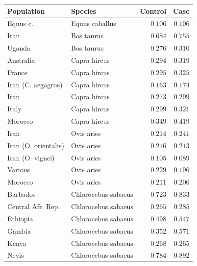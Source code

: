 \documentclass{article}
\begin{document}
    \begin{center}
        \begin{tabular}{|l|l|r|r|}
            \toprule
            Population & Species & Control & Case \\
            \midrule
            \rowcolor{LIGHTGREY} Equus c. & Equus caballus & $ 0.106$ & $ 0.106$ \\
            Iran & Bos taurus & $ 0.684$ & $ 0.755$ \\
            Uganda & Bos taurus & $ 0.276$ & $ 0.310$ \\
            \rowcolor{LIGHTGREY} Australia & Capra hircus & $ 0.294$ & $ 0.319$ \\
            \rowcolor{LIGHTGREY} France & Capra hircus & $ 0.295$ & $ 0.325$ \\
            \rowcolor{LIGHTGREY} Iran (C. aegagrus) & Capra hircus & $ 0.163$ & $ 0.174$ \\
            \rowcolor{LIGHTGREY} Iran & Capra hircus & $ 0.273$ & $ 0.299$ \\
            \rowcolor{LIGHTGREY} Italy & Capra hircus & $ 0.299$ & $ 0.321$ \\
            \rowcolor{LIGHTGREY} Morocco & Capra hircus & $ 0.349$ & $ 0.419$ \\
            Iran & Ovis aries & $ 0.214$ & $ 0.241$ \\
            Iran (O. orientalis) & Ovis aries & $ 0.216$ & $ 0.213$ \\
            Iran (O. vignei) & Ovis aries & $ 0.105$ & $ 0.089$ \\
            Various & Ovis aries & $ 0.229$ & $ 0.196$ \\
            Morocco & Ovis aries & $ 0.211$ & $ 0.206$ \\
            \rowcolor{LIGHTGREY} Barbados & Chlorocebus sabaeus & $ 0.723$ & $ 0.833$ \\
            \rowcolor{LIGHTGREY} Central Afr. Rep. & Chlorocebus sabaeus & $ 0.265$ & $ 0.285$ \\
            \rowcolor{LIGHTGREY} Ethiopia & Chlorocebus sabaeus & $ 0.498$ & $ 0.547$ \\
            \rowcolor{LIGHTGREY} Gambia & Chlorocebus sabaeus & $ 0.352$ & $ 0.571$ \\
            \rowcolor{LIGHTGREY} Kenya & Chlorocebus sabaeus & $ 0.268$ & $ 0.265$ \\
            \rowcolor{LIGHTGREY} Nevis & Chlorocebus sabaeus & $ 0.784$ & $ 0.892$ \\

\end{tabular}
\end{center}
\end{document}
